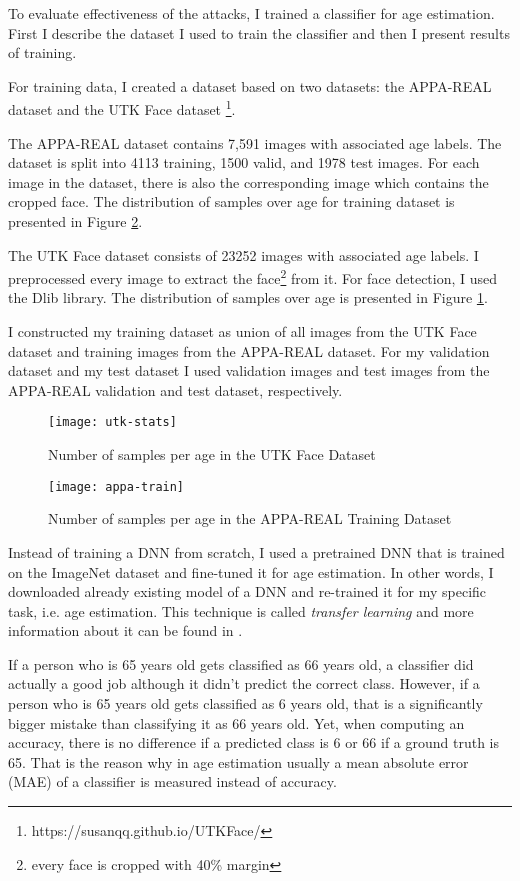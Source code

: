To evaluate effectiveness of the attacks, I trained a classifier for age estimation. 
First I describe the dataset I used to train the classifier and then I present results of training. 

For training data, I created a dataset based on two datasets: the APPA-REAL dataset \cite{agustsson2017appareal}  and the UTK Face dataset \footnote{https://susanqq.github.io/UTKFace/}.

The APPA-REAL dataset contains 7,591 images with associated age labels. The dataset is split into 4113 training, 1500 valid, and 1978 test images. For each image in the dataset, there is also the corresponding image which contains the cropped face. The distribution of samples over age for training dataset is presented in Figure \ref{fig:appa-train-stats}.

The UTK Face dataset consists of 23252 images with associated age labels. I preprocessed every image to extract the face\footnote{every face is cropped with 40\% margin} from it. For face detection, I used the Dlib \cite{dlib09} library. The distribution of samples over age is presented in Figure \ref{fig:utk-stats}.

I constructed my training dataset as union of all images from the UTK Face dataset and training images from the APPA-REAL dataset. For my validation dataset and my test dataset I used validation images and test images from the APPA-REAL validation and test dataset, respectively. 

\begin{figure}[h]
\texttt{[image: utk-stats]}
\caption{Number of samples per age in the UTK Face Dataset}
\label{fig:utk-stats}
\end{figure}

\begin{figure}[h]
\texttt{[image: appa-train]}
\caption{Number of samples per age in the APPA-REAL Training Dataset}
\label{fig:appa-train-stats}
\end{figure}

Instead of training a DNN from scratch, I used a pretrained DNN that is trained on the ImageNet dataset and fine-tuned it for age estimation. In other words, I downloaded already existing model of a DNN and re-trained it for my specific task, i.e. age estimation. This technique is called \textit{transfer learning} and more information about it can be found in \cite{yosinski2014transferable}.

If a person who is 65 years old gets classified as 66 years old, a classifier did actually a good job although it didn't predict the correct class. However, if a person who is 65 years old gets classified as 6 years old, that is a significantly bigger mistake than classifying it as 66 years old. Yet, when computing an accuracy, there is no difference if a predicted class is 6 or 66 if a ground truth is 65. That is the reason why in age estimation usually a mean absolute error (MAE) of a classifier is measured instead of accuracy.


